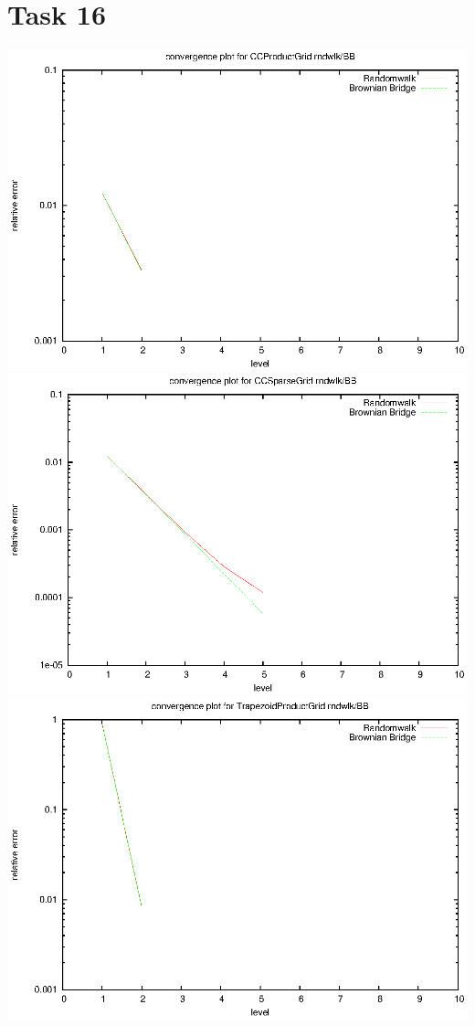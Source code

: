 \documentclass[]{article}
\begin{document}
\section*{Task 16}
\includegraphics{task16_ccprod}\\
\includegraphics{task16_ccsparse}\\
\includegraphics{task16_trapprod}\\
\end{document}
